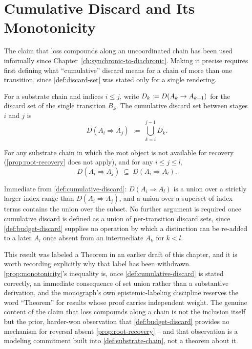 \section{Cumulative Discard and Its Monotonicity}

The claim that loss compounds along an uncoordinated chain has been used
informally since Chapter~\ref{ch:synchronic-to-diachronic}. Making it
precise requires first defining what ``cumulative'' discard means for a
chain of more than one transition, since \cref{def:discard-set} was stated
only for a single rendering.

\begin{definition}
\label{def:cumulative-discard}
For a substrate chain and indices $i \le j$, write $D_k := D(A_k
\to A_{k+1})$ for the discard set of the single transition $B_k$. The
cumulative discard set between stages $i$ and $j$ is
\[
D(A_i \Rightarrow A_j) \;:=\; \bigcup_{k=i}^{j-1} D_k.
\]
\end{definition}

\begin{proposition}
\label{prop:monotonicity}
For any substrate chain in which the root object is not available for
recovery (\cref{prop:root-recovery} does not apply), and for any $i \le j
\le l$,
\[
D(A_i \Rightarrow A_j) \;\subseteq\; D(A_i \Rightarrow A_l).
\]
\end{proposition}

\begin{proofsketch}
Immediate from \cref{def:cumulative-discard}: $D(A_i \Rightarrow A_l)$ is a
union over a strictly larger index range than $D(A_i \Rightarrow A_j)$,
and a union over a superset of index terms contains the union over the
subset. No further argument is required once cumulative discard is defined
as a union of per-transition discard sets, since \cref{def:budget-discard}
supplies no operation by which a distinction can be re-added to a later
$A_l$ once absent from an intermediate $A_k$ for $k < l$.
\end{proofsketch}

This result was labeled a Theorem in an earlier draft of this chapter, and
it is worth recording explicitly why that label has been withdrawn.
\cref{prop:monotonicity}'s inequality is, once
\cref{def:cumulative-discard} is stated correctly, an immediate consequence
of set union rather than a substantive derivation, and the monograph's own
epistemic-labeling discipline reserves the word ``Theorem'' for results
whose proof carries independent weight. The genuine content of the claim
that loss compounds along a chain is not the inclusion itself but the
prior, harder-won observation that \cref{def:budget-discard} provides no
mechanism for reversal absent \cref{prop:root-recovery} -- and that
observation is a modeling commitment built into
\cref{def:substrate-chain}, not a theorem about it.

